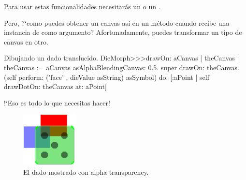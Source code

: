 \documentclass[a4paper,10pt,twoside]{book}
\begin{document}
Para usar estas funcionalidades necesitar\'as un  o un .

Pero, ?`como puedes obtener un canvas as\'i en un m\'etodo  cuando  recibe una instancia de  como argumento?
Afortunadamente, puedes transformar un tipo de canvas en otro.

\begin{method}{Dibujando un dado translucido.}
DieMorph>>>drawOn: aCanvas
	| theCanvas |
	theCanvas := aCanvas asAlphaBlendingCanvas: 0.5.
	super drawOn: theCanvas.
	(self perform: ('face' , dieValue asString) asSymbol)
		do: [:aPoint | self drawDotOn: theCanvas at: aPoint]
\end{method}
\noindent
!`Eso es todo lo que necesitas hacer!

\begin{figure}[ht]
	\centerline{\includegraphics[scale=0.7]{multiMorphs}}
	\caption{El dado mostrado con alpha-transparency.
		}
\end{figure}




\end{document}

